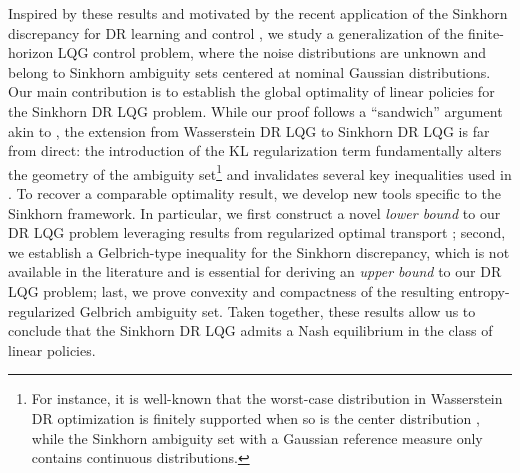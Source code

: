 \documentclass[letterpaper, 10 pt, conference]{ieeeconf}  %
\theoremstyle{ieeeconf}
\begin{document}
Inspired by these results and motivated by the recent application of the Sinkhorn discrepancy for DR learning \cite{sinkhorn, genevay2018learning} and control \cite{cescon2025data}, we study a generalization of the finite-horizon LQG control problem, where the noise distributions are unknown and belong to Sinkhorn ambiguity sets centered at nominal Gaussian distributions. Our main contribution is to establish the global optimality of linear policies for the Sinkhorn DR LQG problem. While our proof follows a ``sandwich'' argument akin to \cite{taskesen2023distributionally}, the extension from Wasserstein DR LQG to Sinkhorn DR LQG is far from direct: the introduction of the KL regularization term fundamentally alters the geometry of the ambiguity set\footnote{For instance, it is well-known that the worst-case distribution in Wasserstein DR optimization is finitely supported when so is the center distribution \cite{gao2023distributionally}, while the Sinkhorn ambiguity set with a Gaussian reference measure only contains continuous distributions.} and invalidates several key inequalities used in \cite{taskesen2023distributionally}. To recover a comparable optimality result, we develop new tools specific to the Sinkhorn framework. In particular,
we first construct a novel \emph{lower bound} to our DR LQG problem leveraging results from regularized optimal transport \cite{del2020statistical};
second, we establish a Gelbrich-type inequality for the Sinkhorn discrepancy, which is not available in the literature and is essential for deriving an \emph{upper bound} to our DR LQG problem; last, we prove convexity and compactness of the resulting entropy-regularized Gelbrich ambiguity set. Taken together, these results allow us to conclude that the Sinkhorn DR LQG admits a Nash equilibrium in the class of linear policies.


\end{document}
